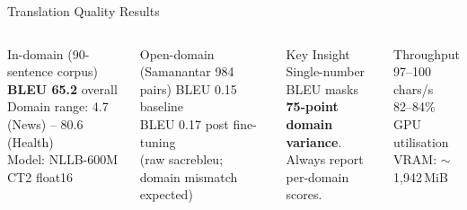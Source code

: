 \documentclass[aspectratio=169,10pt]{beamer}
\begin{document}
\begin{frame}{Translation Quality Results}
  \begin{columns}
    \begin{block}{In-domain (90-sentence corpus)}
      \textbf{BLEU 65.2} overall\\
      Domain range: 4.7 (News) -- 80.6 (Health)\\
      Model: NLLB-600M CT2 float16
    \end{block}
    \vspace{0.3cm}
    \begin{block}{Open-domain (Samanantar 984 pairs)}
      BLEU 0.15 baseline\\
      BLEU 0.17 post fine-tuning\\
      (raw sacrebleu; domain mismatch expected)
    \end{block}

    \begin{alertblock}{Key Insight}
      Single-number BLEU masks\\
      \textbf{75-point domain variance}.\\
      Always report per-domain scores.
    \end{alertblock}
    \vspace{0.3cm}
    \begin{block}{Throughput}
      97--100\,chars/s\\
      82--84\% GPU utilisation\\
      VRAM: $\sim$1,942\,MiB
    \end{block}
  \end{columns}
\end{frame}
\end{document}
